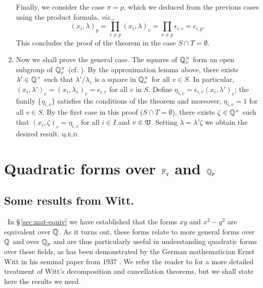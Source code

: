 \begin{enumerate}[nosep, label=(\roman*), wide]
    Finally, we consider the case \(\pi = p\), which we deduced from the
    previous cases using the product formula, \emph{viz.,}
    \[
        (x_i, \lambda)_p = \prod_{v \neq p} (x_i, \lambda)_v = \prod_{v \neq p} \epsilon_{i, v} = \epsilon_{i, p}.
    \]
    This concludes the proof of the theorem in the case \(S \cap T =
    \emptyset\).

    \item Now we shall prove the general case. The squares of
    \(\mathbb{Q}_v^{\times}\) form an open subgroup of \(\mathbb{Q}_v^{\times}\)
    (cf. \cite[p.~18]{serre2012course}). By the approximation lemma above, there
    exists \(\lambda' \in \mathbb{Q}^{\times}\) such that \(\lambda' /
    \lambda_v\) is a square in \(\mathbb{Q}_v^{\times}\) for all \(v \in S\). In
    particular, \((x_i, \lambda')_v = (x_i, \lambda_v)_v = \epsilon_{i, v}\) for
    all \(v\) in \(S\). Define \(\eta_{i, v} = \epsilon_{i, v} (x_i,
    \lambda')_v\); the family \(\{\eta_{i, v}\}\) satisfies the conditions of
    the theorem and moreover, \(\eta_{i, v} = 1\) for all \(v \in S\). By the
    first case in this proof (\(S \cap T = \emptyset\)), there exists \(\zeta
    \in \mathbb{Q}^{\times}\) such that \((x_i, \zeta)_v = \eta_{i, v}\) for all
    \(i \in I\) and \(v \in \mathfrak{V}\). Setting \(\lambda = \lambda' \zeta\) we
    obtain the desired result. {\scshape q.e.d.}
\end{enumerate}

\section{Quadratic forms over \(\mathbb{F}_q\) and \(\mathbb{Q}_p\)}

\subsection{Some results from Witt.}~In \S\,\ref{sec:mat-equiv} we have
established that the forms \(xy\) and \(x^2 - y^2\) are equivalent over
\(\mathbb{Q}\). As it turns out, these forms relate to more general forms over
\(\mathbb{Q}\) and over \(\mathbb{Q}_p\) and are thus particularly useful in
understanding quadratic forms over these fields, as has been demonstrated by the
German mathematician Ernst Witt in his seminal paper from 1937
\cite{witt1937theorie}. We refer the reader to \cite{lam1973quadratic} for a
more detailed treatment of Witt's decomposition and cancellation theorems, but
we shall state here the results we need.\label{sec:results-from-witt}

